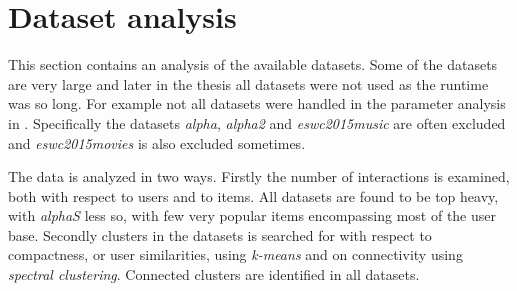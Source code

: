 

\section{Dataset analysis}\label{sec:results:data}

This section contains an analysis of the available datasets. Some of the datasets are very large and later in the thesis all datasets were not used as the runtime was so long. For example not all datasets were handled in the parameter analysis in . Specifically the datasets \textit{alpha}, \textit{alpha2} and \textit{eswc2015music} are often excluded and \textit{eswc2015movies} is also excluded sometimes.

The data is analyzed in two ways. Firstly the number of interactions is examined, both with respect to users and to items. All datasets are found to be top heavy, with \textit{alphaS} less so, with few very popular items encompassing most of the user base. Secondly clusters in the datasets is searched for with respect to compactness, or user similarities, using \textit{k-means} and on connectivity using \textit{spectral clustering}. Connected clusters are identified in all datasets.





